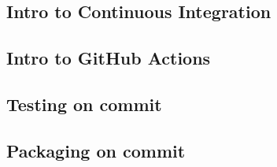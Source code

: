 \documentclass{csse4400}
\begin{document}
\subsection{Intro to Continuous Integration}


\subsection{Intro to GitHub Actions}

\subsection{Testing on commit}

\subsection{Packaging on commit}



\end{document}
